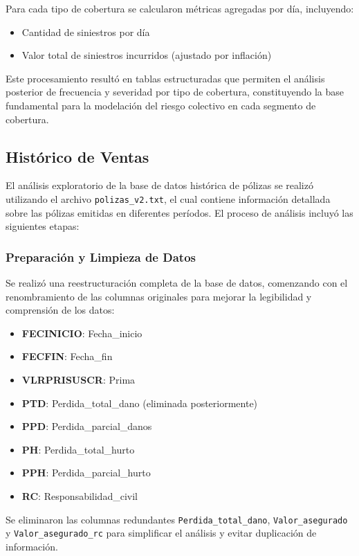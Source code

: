 Para cada tipo de cobertura se calcularon métricas agregadas por día, incluyendo:
\begin{itemize}
    \item Cantidad de siniestros por día
    \item Valor total de siniestros incurridos (ajustado por inflación)
\end{itemize}

Este procesamiento resultó en tablas estructuradas que permiten el análisis posterior de frecuencia y severidad por tipo de cobertura, constituyendo la base fundamental para la modelación del riesgo colectivo en cada segmento de cobertura.

\subsection{Histórico de Ventas}

El análisis exploratorio de la base de datos histórica de pólizas se realizó utilizando el archivo \texttt{polizas\_v2.txt}, el cual contiene información detallada sobre las pólizas emitidas en diferentes períodos. El proceso de análisis incluyó las siguientes etapas:

\subsubsection{Preparación y Limpieza de Datos}

Se realizó una reestructuración completa de la base de datos, comenzando con el renombramiento de las columnas originales para mejorar la legibilidad y comprensión de los datos:

\begin{itemize}
    \item \textbf{FECINICIO}: Fecha\_inicio
    \item \textbf{FECFIN}: Fecha\_fin
    \item \textbf{VLRPRISUSCR}: Prima
    \item \textbf{PTD}: Perdida\_total\_dano (eliminada posteriormente)
    \item \textbf{PPD}: Perdida\_parcial\_danos
    \item \textbf{PH}: Perdida\_total\_hurto
    \item \textbf{PPH}: Perdida\_parcial\_hurto
    \item \textbf{RC}: Responsabilidad\_civil
\end{itemize}

Se eliminaron las columnas redundantes \texttt{Perdida\_total\_dano}, \texttt{Valor\_asegurado} y \texttt{Valor\_asegurado\_rc} para simplificar el análisis y evitar duplicación de información.


